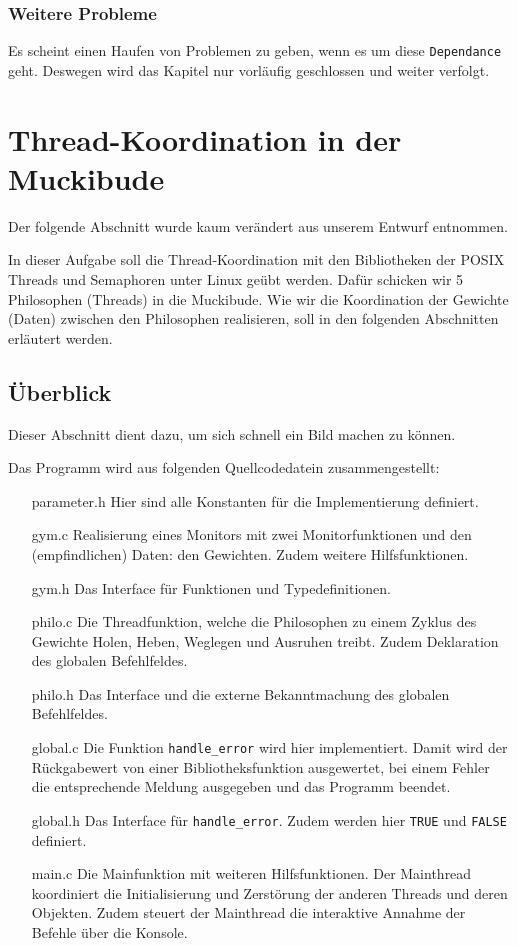 \documentclass[
   draft=false
  ,paper=a4
  ,twoside=false
  ,fontsize=11pt
  ,headsepline
  ,BCOR10mm
  ,DIV11
  ,parskip=full+
]{scrartcl} %
\begin{document}
\subsubsection*{Weitere Probleme}
Es scheint einen Haufen von Problemen  zu geben, wenn es um diese
\texttt{Dependance} geht. Deswegen wird das Kapitel nur vorläufig
geschlossen und weiter verfolgt.

\section{Thread-Koordination in der Muckibude}
Der folgende Abschnitt wurde kaum verändert aus unserem Entwurf entnommen.

In dieser Aufgabe soll die Thread-Koordination mit den Bibliotheken der
POSIX Threads und Semaphoren unter Linux geübt werden. Dafür schicken wir 5
Philosophen (Threads) in die Muckibude. Wie wir die Koordination der Gewichte
(Daten) zwischen den Philosophen realisieren, soll in den folgenden Abschnitten
erläutert werden.

\subsection{Überblick}
Dieser Abschnitt dient dazu, um sich schnell ein Bild machen zu können.

Das Programm wird aus folgenden Quellcodedatein zusammengestellt:
\begin{enumerate}
  \item[parameter.h] Hier sind alle Konstanten für die Implementierung
    definiert.
  \item[gym.c] Realisierung eines Monitors mit zwei Monitorfunktionen und den
    (empfindlichen) Daten: den Gewichten. Zudem weitere Hilfsfunktionen.
  \item[gym.h] Das Interface für Funktionen und Typedefinitionen.
  \item[philo.c] Die Threadfunktion, welche die Philosophen zu einem Zyklus
    des Gewichte Holen, Heben, Weglegen und Ausruhen treibt. Zudem Deklaration
    des globalen Befehlfeldes.
  \item[philo.h] Das Interface und die externe Bekanntmachung des globalen
   Befehlfeldes.
  \item[global.c] Die Funktion \texttt{handle\_error} wird hier implementiert.
    Damit wird der Rückgabewert von einer Bibliotheksfunktion ausgewertet,
    bei einem Fehler die entsprechende Meldung ausgegeben und das Programm
    beendet.
  \item[global.h] Das Interface für \texttt{handle\_error}. Zudem werden hier
    \texttt{TRUE} und \texttt{FALSE} definiert.
  \item[main.c] Die Mainfunktion mit weiteren Hilfsfunktionen. Der Mainthread
    koordiniert die Initialisierung und Zerstörung der anderen Threads und
    deren Objekten. Zudem steuert der Mainthread die interaktive Annahme der Befehle
    über die Konsole.
\end{enumerate}
\end{document}
